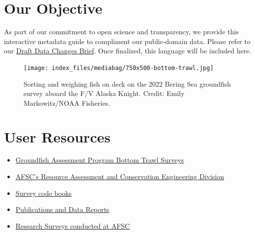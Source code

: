 \documentclass[
  letterpaper,
  oneside,
  open=any]{scrbook}
\providecommand{\tightlist}{%
  \setlength{\itemsep}{0pt}\setlength{\parskip}{0pt}}\usepackage{longtable,booktabs,array}
\begin{document}
\hypertarget{our-objective}{%
\section*{Our Objective}\label{our-objective}}


As part of our commitment to open science and transparency, we provide
this interactive metadata guide to compliment our public-domain data.
Please refer to our
\href{https://docs.google.com/document/d/1ie0it6G_V_PrpO1fYe-731Fvubuahn2yi0ixBIpaYO8/edit?usp=sharing}{Draft
Data Changes Brief}. Once finalized, this language will be included
here.

\begin{figure}

{\centering \texttt{[image: index\_files/mediabag/750x500-bottom-trawl.jpg]}

}

\caption{Sorting and weighing fish on deck on the 2022 Bering Sea
groundfish survey aboard the F/V Alaska Knight. Credit: Emily
Markowitz/NOAA Fisheries.}

\end{figure}

\hypertarget{user-resources}{%
\section*{User Resources}\label{user-resources}}


\begin{itemize}
\tightlist
\item
  \href{https://www.fisheries.noaa.gov/alaska/science-data/groundfish-assessment-program-bottom-trawl-surveys}{Groundfish
  Assessment Program Bottom Trawl Surveys}
\item
  \href{https://www.fisheries.noaa.gov/about/resource-assessment-and-conservation-engineering-division}{AFSC's
  Resource Assessment and Conservation Engineering Division}
\item
  \href{https://www.fisheries.noaa.gov/resource/document/groundfish-survey-species-code-manual-and-data-codes-manual}{Survey
  code books}
\item
  \href{https://repository.library.noaa.gov/}{Publications and Data
  Reports}
\item
  \href{https://www.fisheries.noaa.gov/alaska/ecosystems/alaska-fish-research-surveys}{Research
  Surveys conducted at AFSC}
\end{itemize}
\end{document}
